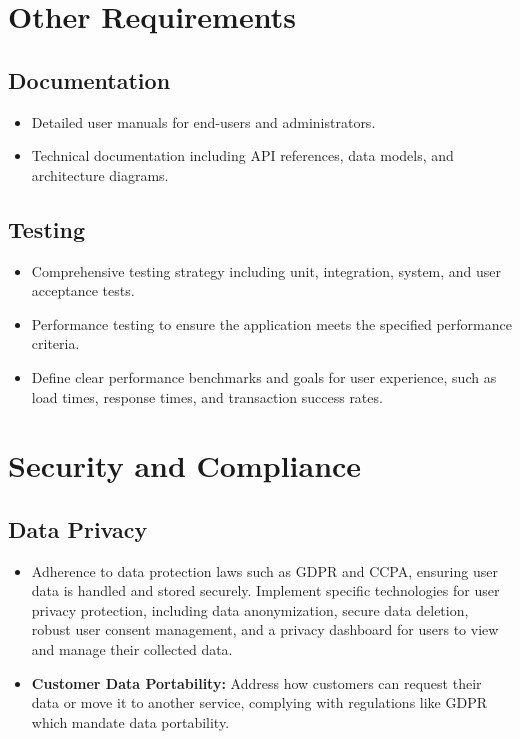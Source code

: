 \documentclass[11pt]{article}
\begin{document}
	\section*{Other Requirements}
	
	\subsection*{Documentation}
	\begin{itemize}
		\item Detailed user manuals for end-users and administrators.
		\item Technical documentation including API references, data models, and architecture diagrams.
	\end{itemize}
	
	\subsection*{Testing}
	\begin{itemize}
		\item Comprehensive testing strategy including unit, integration, system, and user acceptance tests.
		\item Performance testing to ensure the application meets the specified performance criteria.
		\item Define clear performance benchmarks and goals for user experience, such as load times, response times, and transaction success rates.
	\end{itemize}
	
	\section*{Security and Compliance}
	
	\subsection*{Data Privacy}
	\begin{itemize}
		\item Adherence to data protection laws such as GDPR and CCPA, ensuring user data is handled and stored securely. Implement specific technologies for user privacy protection, including data anonymization, secure data deletion, robust user consent management, and a privacy dashboard for users to view and manage their collected data.
		\item \textbf{Customer Data Portability:} Address how customers can request their data or move it to another service, complying with regulations like GDPR which mandate data portability.
	\end{itemize}
	
\end{document}
